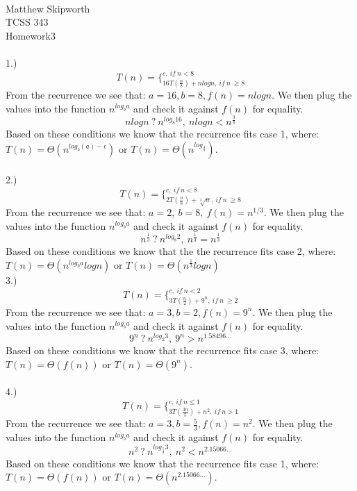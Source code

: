 \documentclass[page=4,11pt]{article}
\begin{document}
\ \\
Matthew Skipworth\\
TCSS 343\\
Homework3\\ \\
1.) $$T(n)= \Bigg\{^{c,\ if\ n<8}_{16T(\frac{n}{8})+nlogn,\ if\ n\ \geq 8}$$
From the recurrence we see that: $a=16, b=8, f(n)=nlogn$.
We then plug the values into the function $n^{log_{b}a}$ and check
it against $f(n)$ for equality.
$$nlogn\ ?\ n^{log_{8}16},\ nlogn<n^{\frac{3}{4}}$$
Based on these conditions we know that the recurrence fits case 1, 
where: $T(n)= \Theta(n^{log_{b}(a)-\epsilon})$ or $T(n)=  \Theta(n^{log_{\frac{4}{3}}})$.\\ \\
2.) $$T(n)= \Bigg\{^{c,\ if\ n<8}_{2T(\frac{n}{8})+\sqrt[3]{n},\ if\ n\ \geq 8}$$
From the recurrence we see that: $a=2,\ b=8,\ f(n)=n^{1/3}$.
We then plug the values into the function $n^{log_{b}a}$ and check
it against $f(n)$ for equality.
$$n^{ \frac{1}{3}}\ ?\ n^{log_{8}2},\ n^{ \frac{1}{3}}=n^{ \frac{1}{3}}$$
Based on these conditions we know that the the recurrence fits case 2, where: $T(n)= \Theta(n^{log_{b}a}logn)$ or $T(n)=\Theta(n^{\frac{1}{3}}logn)$\\
3.) $$T(n)= \Bigg\{^{c,\ if\ n<2}_{3T(\frac{n}{2})+9^{n},\ if\ n\ \geq 2}$$
From the recurrence we see that: $a=3, b=2, f(n)=9^n$.
We then plug the values into the function $n^{log_{b}a}$ and check
it against $f(n)$ for equality.
$$9^n\ ?\ n^{log_{2}3},\ 9^n>n^{1.58496 \dots}$$
Based on these conditions we know that the recurrence fits case 3, 
where: $T(n)= \Theta(f(n))$ or $T(n)=  \Theta(9^n)$.\\ \\
4.) $$T(n)= \Bigg\{^{c,\ if\ n\leq1}_{3T(\frac{3n}{5})+n^{2},\ if\ n > 1}$$
From the recurrence we see that: $a=3, b=\frac{5}{3}, f(n)=n^{2}$.
We then plug the values into the function $n^{log_{b}a}$ and check
it against $f(n)$ for equality.
$$n^{2}\ ?\ n^{log_{\frac{5}{3}}3},\ n^2<n^{2.15066 \dots}$$
Based on these conditions we know that the recurrence fits case 1, 
where: $T(n)= \Theta(f(n))$ or $T(n)=  \Theta(n^{2.15066 \dots})$.\\ \\
\end{document}
